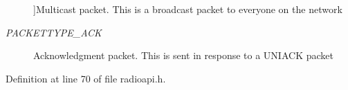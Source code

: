 \begin{Desc}
\begin{description}
{}]Multicast packet. This is a broadcast packet to everyone on the network \item[{\em 
\hypertarget{group___radio_ggaba81c4c5fad7e2e0cef01f8e6c710ecbacb072737fc8b959c9d08bccf3880a372}{P\-A\-C\-K\-E\-T\-T\-Y\-P\-E\-\_\-\-A\-C\-K}\label{group___radio_ggaba81c4c5fad7e2e0cef01f8e6c710ecbacb072737fc8b959c9d08bccf3880a372}
}]Acknowledgment packet. This is sent in response to a U\-N\-I\-A\-C\-K packet \end{description}
\end{Desc}


Definition at line 70 of file radioapi.\-h.

